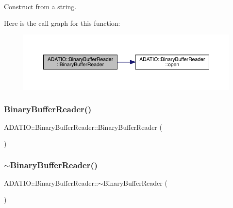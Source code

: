 Construct from a string. 

Here is the call graph for this function\+:\nopagebreak
\begin{figure}[H]
\begin{center}
\leavevmode
\includegraphics[width=350pt]{d0/df3/classADATIO_1_1BinaryBufferReader_af3ef435054f2f29a596ca4b45b3642e5_cgraph}
\end{center}
\end{figure}
\mbox{\label{classADATIO_1_1BinaryBufferReader_a9bb5e29231fc81acbe7f0e6ab2720f6c}} 
\subsubsection{\texorpdfstring{BinaryBufferReader()}{BinaryBufferReader()}\hspace{0.1cm}{\footnotesize\ttfamily [3/4]}}
{\footnotesize\ttfamily A\+D\+A\+T\+I\+O\+::\+Binary\+Buffer\+Reader\+::\+Binary\+Buffer\+Reader (\begin{DoxyParamCaption}{ }\end{DoxyParamCaption})}

\mbox{\label{classADATIO_1_1BinaryBufferReader_ab890177a0ac7f1e191ebd15d148fc48b}} 
\subsubsection{\texorpdfstring{$\sim$BinaryBufferReader()}{~BinaryBufferReader()}\hspace{0.1cm}{\footnotesize\ttfamily [2/2]}}
{\footnotesize\ttfamily A\+D\+A\+T\+I\+O\+::\+Binary\+Buffer\+Reader\+::$\sim$\+Binary\+Buffer\+Reader (\begin{DoxyParamCaption}{ }\end{DoxyParamCaption})}

